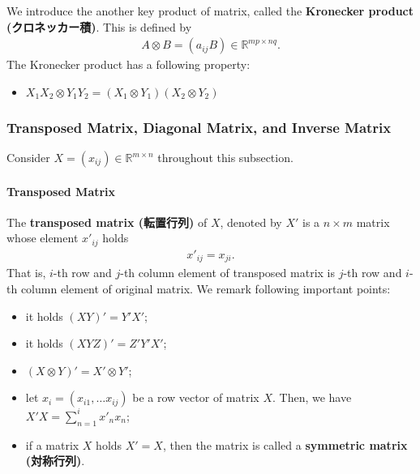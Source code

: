 \documentclass[
  12pt,
]{article}
\providecommand{\tightlist}{%
  \setlength{\itemsep}{0pt}\setlength{\parskip}{0pt}}
\begin{document}
We introduce the another key product of matrix, called the \textbf{Kronecker product (クロネッカー積)}.
This is defined by
\begin{align*}
  A \otimes B = (a_{ij} B) \in \mathbb{R}^{mp \times nq}.
\end{align*}
The Kronecker product has a following property:

\begin{itemize}
\tightlist
\item
  \(X_{1}X_{2} \otimes Y_{1}Y_{2} = (X_{1} \otimes Y_{1})(X_{2} \otimes Y_{2})\)
\end{itemize}

\hypertarget{transposed-matrix-diagonal-matrix-and-inverse-matrix}{%
\subsubsection{Transposed Matrix, Diagonal Matrix, and Inverse Matrix}\label{transposed-matrix-diagonal-matrix-and-inverse-matrix}}

Consider \(X = (x_{ij}) \in \mathbb{R}^{m \times n}\) throughout this subsection.

\hypertarget{transposed-matrix}{%
\paragraph{Transposed Matrix}\label{transposed-matrix}}

The \textbf{transposed matrix (転置行列)} of \(X\), denoted by \(X'\) is a \(n \times m\) matrix whose element \(x'_{ij}\) holds
\begin{align*}
  x'_{ij} = x_{ji}.
\end{align*}
That is, \(i\)-th row and \(j\)-th column element of transposed matrix is
\(j\)-th row and \(i\)-th column element of original matrix.
We remark following important points:

\begin{itemize}
\tightlist
\item
  it holds \((XY)' = Y'X'\);
\item
  it holds \((XYZ)' = Z'Y'X'\);
\item
  \((X \otimes Y)' = X' \otimes Y'\);
\item
  let \(x_i = (x_{i1}, \ldots x_{ij})\) be a row vector of matrix \(X\). Then, we have \(X'X = \sum_{n = 1}^i x'_n x_n\);
\item
  if a matrix \(X\) holds \(X' = X\), then the matrix is called a \textbf{symmetric matrix (対称行列)}.
\end{itemize}
\end{document}
